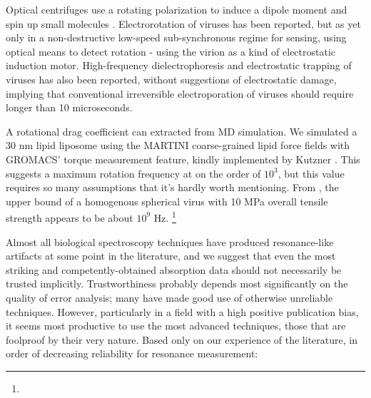\documentclass[paper.tex]{subfiles}
\begin{document}
\begin{multicols}{1}
Optical centrifuges use a rotating polarization to induce a dipole moment and spin up small molecules \cite{Forced2000}\cite{Spinning2000}. Electrorotation\cite{RotatingFieldInduced1982}\cite{Electrorotation1988}\cite{Electrorotation1997}\cite{Dielectric1988} of viruses has been reported\cite{Analysis2004}\cite{New1999}\cite{comprehensive2001}, but as yet only in a non-destructive low-speed sub-synchronous regime for sensing, using optical means to detect rotation - using the virion as a kind of electrostatic induction motor. High-frequency dielectrophoresis and electrostatic trapping of viruses has also been reported\cite{Accumulation2006}, without suggestions of electrostatic damage, implying that conventional irreversible electroporation of viruses should require longer than 10 microseconds.

A rotational drag coefficient can extracted from MD simulation\cite{Evaluating2017}. We simulated a 30 nm lipid liposome using the MARTINI coarse-grained \cite{MARTINI2007} lipid force fields with GROMACS\cite{GROMACS2005}' torque measurement feature, kindly implemented by Kutzner \cite{Keep2011}. This suggests a maximum rotation frequency at on the order of $10^3$, but this value requires so many assumptions that it's hardly worth mentioning. From \cite{Spinning2008}, the upper bound of a homogenous spherical virus with 10 MPa overall tensile strength appears to be about $10^9$ Hz. \footnote{}



Almost all biological spectroscopy techniques have produced resonance-like artifacts at some point in the literature, and we suggest that even the most striking and competently-obtained absorption data should not necessarily be trusted implicitly. Trustworthiness probably depends most significantly on the quality of error analysis; many have made good use of otherwise unreliable techniques. However, particularly in a field with a high positive publication bias, it seems most productive to use the most advanced techniques, those that are foolproof by their very nature. Based only on our experience of the literature, in order of decreasing reliability for resonance measurement:


\end{multicols}
\end{document}
